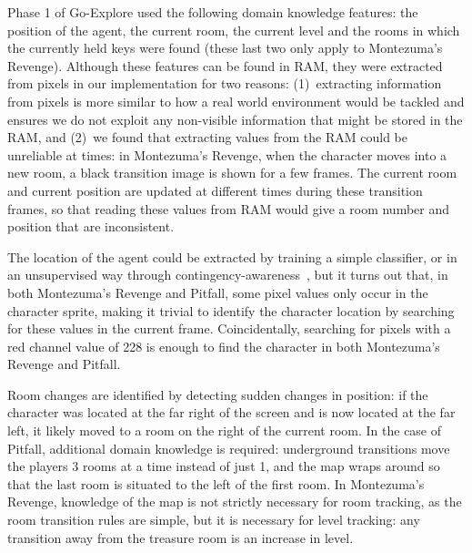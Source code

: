\documentclass{article}
\begin{document}
Phase 1 of Go-Explore used the following domain knowledge features: the  position of the agent, the current room, the current level and the rooms in which the currently held keys were found (these last two only apply to Montezuma's Revenge). Although these features can be found in RAM, they were extracted from pixels in our implementation for two reasons: (1)~extracting information from pixels is more similar to how a real world environment would be tackled and ensures we do not exploit any non-visible information that might be stored in the RAM, and (2)~we found that extracting values from the RAM could be unreliable at times: in Montezuma's Revenge, when the character moves into a new room, a black transition image is shown for a few frames. The current room and current  position are updated at different times during these transition frames, so that reading these values from RAM would give a room number and  position that are inconsistent.

The location of the agent could be extracted by training a simple classifier, or in an unsupervised way through contingency-awareness~\cite{Choi2018ContingencyAwareEI}, but it turns out that, in both Montezuma's Revenge and Pitfall, some pixel values only occur in the character sprite, making it trivial to identify the character location by searching for these values in the current frame. Coincidentally, searching for pixels with a red channel value of 228 is enough to find the character in both Montezuma's Revenge and Pitfall.

Room changes are identified by detecting sudden changes in  position: if the character was located at the far right of the screen and is now located at the far left, it likely moved to a room on the right of the current room. In the case of Pitfall, additional domain knowledge is required: underground transitions move the players 3 rooms at a time instead of just 1, and the map wraps around so that the last room is situated to the left of the first room. In Montezuma's Revenge, knowledge of the map is not strictly necessary for room tracking, as the room transition rules are simple, but it is necessary for level tracking: any transition away from the treasure room is an increase in level.
\end{document}
